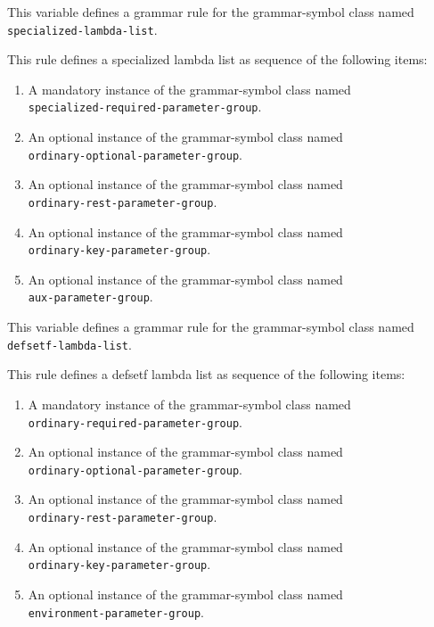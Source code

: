 
This variable defines a grammar rule for the grammar-symbol class
named \texttt{specialized-lambda-list}.

This rule defines a specialized lambda list as sequence of the
following items:

\begin{enumerate}
\item A mandatory instance of the grammar-symbol class named\\
  \texttt{specialized-required-parameter-group}.
\item An optional instance of the grammar-symbol class named\\
  \texttt{ordinary-optional-parameter-group}.
\item An optional instance of the grammar-symbol class named\\
\texttt{ordinary-rest-parameter-group}.
\item An optional instance of the grammar-symbol class named\\
\texttt{ordinary-key-parameter-group}.
\item An optional instance of the grammar-symbol class named\\
\texttt{aux-parameter-group}.
\end{enumerate}

This variable defines a grammar rule for the grammar-symbol class
named \texttt{defsetf-lambda-list}.

This rule defines a defsetf lambda list as sequence of the following
items:

\begin{enumerate}
\item A mandatory instance of the grammar-symbol class named\\
  \texttt{ordinary-required-parameter-group}.
\item An optional instance of the grammar-symbol class named\\
  \texttt{ordinary-optional-parameter-group}.
\item An optional instance of the grammar-symbol class named\\
\texttt{ordinary-rest-parameter-group}.
\item An optional instance of the grammar-symbol class named\\
\texttt{ordinary-key-parameter-group}.
\item An optional instance of the grammar-symbol class named\\
\texttt{environment-parameter-group}.
\end{enumerate}

